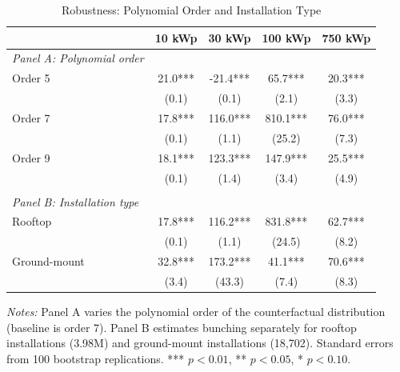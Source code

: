 \begin{table}[t]
\centering
\caption{Robustness: Polynomial Order and Installation Type}
\label{tab:robustness}
\begin{threeparttable}
\begin{tabular}{lcccc}
\toprule
 & 10 kWp & 30 kWp & 100 kWp & 750 kWp \\
\midrule
\textit{Panel A: Polynomial order} & & & & \\
\quad Order 5 & 21.0*** & -21.4*** & 65.7*** & 20.3*** \\
\quad & (0.1) & (0.1) & (2.1) & (3.3) \\
\quad Order 7 & 17.8*** & 116.0*** & 810.1*** & 76.0*** \\
\quad & (0.1) & (1.1) & (25.2) & (7.3) \\
\quad Order 9 & 18.1*** & 123.3*** & 147.9*** & 25.5*** \\
\quad & (0.1) & (1.4) & (3.4) & (4.9) \\
 & & & & \\
\textit{Panel B: Installation type} & & & & \\
\quad Rooftop & 17.8*** & 116.2*** & 831.8*** & 62.7*** \\
\quad & (0.1) & (1.1) & (24.5) & (8.2) \\
\quad Ground-mount & 32.8*** & 173.2*** & 41.1*** & 70.6*** \\
\quad & (3.4) & (43.3) & (7.4) & (8.3) \\
\bottomrule
\end{tabular}
\begin{tablenotes}[flushleft]\footnotesize
\item \textit{Notes:} Panel A varies the polynomial order of the counterfactual distribution (baseline is order 7). Panel B estimates bunching separately for rooftop installations (3.98M) and ground-mount installations (18,702). Standard errors from 100 bootstrap replications. *** $p<0.01$, ** $p<0.05$, * $p<0.10$.
\end{tablenotes}
\end{threeparttable}
\end{table}
